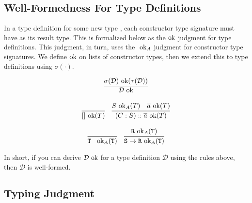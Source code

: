 \documentclass[10pt]{article}
\begin{document}
\subsection{Well-Formedness For Type Definitions}

In a type definition for some new type , each constructor type signature must have  as its result type. This is
formalized below as the$\textnormal{ ok}$ judgment for type definitions. This judgment, in turn, uses the $\textnormal{ ok}_A$ judgment for constructor
type signatures. We define$\textnormal{ ok}$ on lists of constructor types, then we extend this to type definitions using $\sigma(\cdot)$.

\[
  \begin{array}{c}
    \infer{\mathcal{D} \ok}{\sigma(\mathcal{D}) \ok(\tau(\mathcal{D}))}
    \\\\

    \infer{[] \ok(T)}{}
    ~~~
    \infer{(C : S) :: \overline{a} \ok(T)}{S \ok_A(T) & \overline{a} \ok(T) }
    \\\\
    \infer{\ttt{T }\ok_A(\ttt{T})}{}
    ~~~
    \infer{\ttt{S} \ra \ttt{R} \ok_A(\ttt{T})}{\ttt{R} \ok_A(\ttt{T})}
  \end{array}
\]

\noindent
In short, if you can derive $\mathcal{D}\textnormal{ ok}$ for a type definition $\mathcal{D}$ using the rules above, then $\mathcal{D}$ is well-formed.

\subsection{Typing Judgment}
\end{document}
